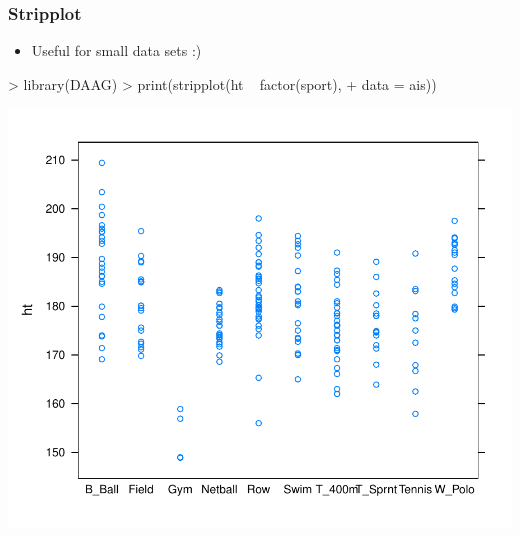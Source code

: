 \begin{frame}
  \frametitle{Stripplot}
  \begin{itemize}
  \item Useful for small data sets :)
  \end{itemize}
\begin{Schunk}
\begin{Sinput}
> library(DAAG)
> print(stripplot(ht ~ factor(sport), 
+     data = ais))
\end{Sinput}
\end{Schunk}
\includegraphics{plots/fig-018}
\end{frame}

